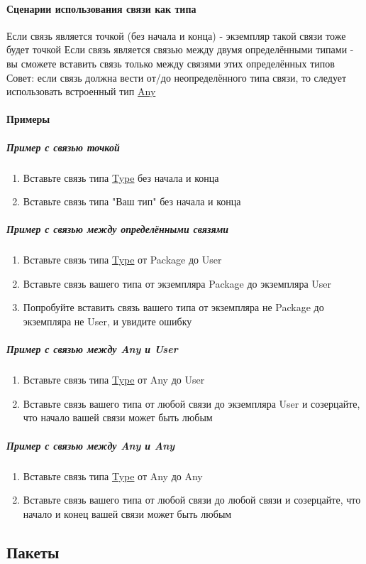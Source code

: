 \documentclass{article}
\begin{document}
\paragraph{Сценарии использования связи как типа}
Если связь является точкой (без начала и конца) - экземпляр такой связи тоже
будет точкой
Если связь является связью между двумя определёнными типами - вы сможете
вставить связь только между связями этих определённых типов
Совет: если связь должна вести от/до неопределённого типа связи, то следует
использовать встроенный тип \hyperlink{any.Def}{Any}
\paragraph{Примеры}
\subparagraph{Пример с связью точкой}
\begin{enumerate}
  \item Вставьте связь типа \hyperlink{type.Def}{Type} без начала и конца
  \item Вставьте связь типа "Ваш тип" без начала и конца
\end{enumerate}
\subparagraph{Пример с связью между определёнными связями}
\begin{enumerate}
  \item Вставьте связь типа \hyperlink{type.Def}{Type} от Package до User
  \item Вставьте связь вашего типа от экземпляра Package до экземпляра User
  \item Попробуйте вставить связь вашего типа от экземпляра не Package до
        экземпляра не User, и увидите ошибку
\end{enumerate}
\subparagraph{Пример с связью между Any и User}
\begin{enumerate}
  \item Вставьте связь типа \hyperlink{type.Def}{Type} от Any до User
  \item Вставьте связь вашего типа от любой связи до экземпляра User и
        созерцайте, что начало вашей связи может быть любым
\end{enumerate}
\subparagraph{Пример с связью между Any и Any}
\begin{enumerate}
  \item Вставьте связь типа \hyperlink{type.Def}{Type} от Any до Any
  \item Вставьте связь вашего типа от любой связи до любой связи и
        созерцайте, что начало и конец вашей связи может быть любым
\end{enumerate}
\subsection{Пакеты}
\end{document}
